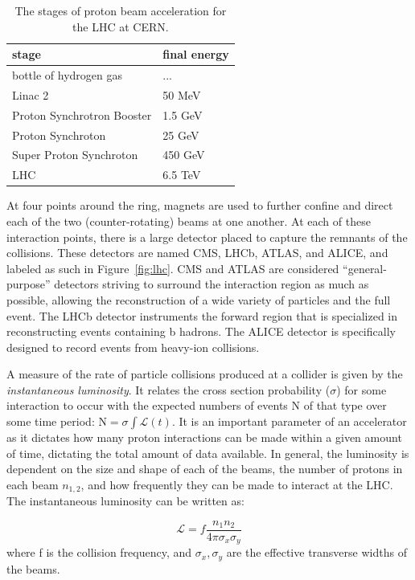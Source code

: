 \begin{table}
\centering
\caption{The stages of proton beam acceleration for the LHC at CERN.}
\label{tab:stages}
\begin{tabular}{ll}
\hline\hline
stage & final energy\\
\hline
bottle of hydrogen gas & ...\\
Linac 2 & 50 MeV\\
Proton Synchrotron Booster & 1.5 GeV\\
Proton Synchroton & 25 GeV\\
Super Proton Synchroton & 450 GeV\\
LHC & 6.5 TeV\\
\hline
\hline
\end{tabular}
\end{table}

At four points around the ring, magnets are used to further confine and direct each of the two (counter-rotating) beams at one another. At each of these interaction points, there is a large detector placed to capture the remnants of the collisions. These detectors are named CMS, LHCb, ATLAS, and ALICE, and labeled as such in Figure~\ref{fig:lhc}. CMS and ATLAS are considered ``general-purpose'' detectors striving to surround the interaction region as much as possible, allowing the reconstruction of a wide variety of particles and the full event. The LHCb detector instruments the forward region that is specialized in reconstructing events containing b hadrons.  The ALICE detector is specifically designed to record events from heavy-ion collisions.

A measure of the rate of particle collisions produced at a collider is given by the \textit{instantaneous luminosity}. It relates the cross section probability ($\sigma$) for some interaction to occur with the expected numbers of events N of that type over some time period: $\textrm{N} = \sigma \int \mathcal{L}(t)$. It is an important parameter of an accelerator as it dictates how many proton interactions can be made within a given amount of time, dictating the total amount of data available. In general, the luminosity is dependent on the size and shape of each of the beams, the number of protons in each beam $n_{1,2}$, and how frequently they can be made to interact at the LHC. The instantaneous luminosity can be written as:

\begin{equation}
\label{eq:lumi}
\mathcal{L} = f \frac{n_{1} n_{2}}  { 4 \pi \sigma_{x} \sigma_{y}}
\end{equation}
where f is the collision frequency, and $\sigma_{x}, \sigma_{y}$ are the effective transverse widths of the beams.

